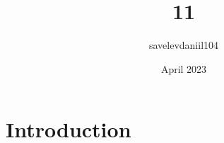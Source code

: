 \documentclass{article, 14pt}
\title{11}
\author{savelevdaniil104 }
\date{April 2023}
\begin{document}
\maketitle

\section{Introduction}
\end{document}
